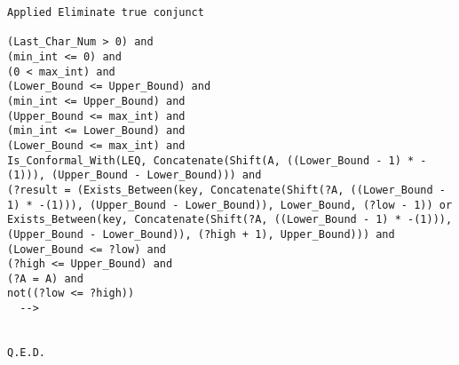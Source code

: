\begin{lstlisting}[language=resolve]
Applied Eliminate true conjunct

(Last_Char_Num > 0) and
(min_int <= 0) and
(0 < max_int) and
(Lower_Bound <= Upper_Bound) and
(min_int <= Upper_Bound) and
(Upper_Bound <= max_int) and
(min_int <= Lower_Bound) and
(Lower_Bound <= max_int) and
Is_Conformal_With(LEQ, Concatenate(Shift(A, ((Lower_Bound - 1) * -(1))), (Upper_Bound - Lower_Bound))) and
(?result = (Exists_Between(key, Concatenate(Shift(?A, ((Lower_Bound - 1) * -(1))), (Upper_Bound - Lower_Bound)), Lower_Bound, (?low - 1)) or Exists_Between(key, Concatenate(Shift(?A, ((Lower_Bound - 1) * -(1))), (Upper_Bound - Lower_Bound)), (?high + 1), Upper_Bound))) and
(Lower_Bound <= ?low) and
(?high <= Upper_Bound) and
(?A = A) and
not((?low <= ?high))
  -->


Q.E.D.

\end{lstlisting}
